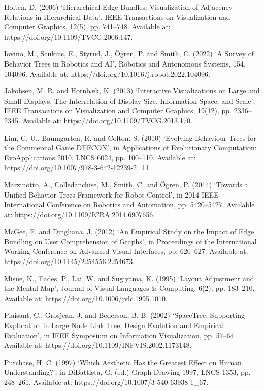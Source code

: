 \documentclass[11pt,a4paper,oneside,extrafontsizes]{memoir}
\begin{document}
Holten, D. (2006) ‘Hierarchical Edge Bundles: Visualization of Adjacency Relations in Hierarchical Data’, IEEE Transactions on Visualization and Computer Graphics, 12(5), pp. 741–748. Available at: https://doi.org/10.1109/TVCG.2006.147.

Iovino, M., Scukins, E., Styrud, J., Ögren, P. and Smith, C. (2022) ‘A Survey of Behavior Trees in Robotics and AI’, Robotics and Autonomous Systems, 154, 104096. Available at: https://doi.org/10.1016/j.robot.2022.104096.

Jakobsen, M. R. and Hornbæk, K. (2013) ‘Interactive Visualizations on Large and Small Displays: The Interrelation of Display Size, Information Space, and Scale’, IEEE Transactions on Visualization and Computer Graphics, 19(12), pp. 2336–2345. Available at: https://doi.org/10.1109/TVCG.2013.170.

Lim, C.-U., Baumgarten, R. and Colton, S. (2010) ‘Evolving Behaviour Trees for the Commercial Game DEFCON’, in Applications of Evolutionary Computation: EvoApplications 2010, LNCS 6024, pp. 100–110. Available at: https://doi.org/10.1007/978-3-642-12239-2\_11.

Marzinotto, A., Colledanchise, M., Smith, C. and Ögren, P. (2014) ‘Towards a Unified Behavior Trees Framework for Robot Control’, in 2014 IEEE International Conference on Robotics and Automation, pp. 5420–5427. Available at: https://doi.org/10.1109/ICRA.2014.6907656.

McGee, F. and Dingliana, J. (2012) ‘An Empirical Study on the Impact of Edge Bundling on User Comprehension of Graphs’, in Proceedings of the International Working Conference on Advanced Visual Interfaces, pp. 620–627. Available at: https://doi.org/10.1145/2254556.2254673.

Misue, K., Eades, P., Lai, W. and Sugiyama, K. (1995) ‘Layout Adjustment and the Mental Map’, Journal of Visual Languages \& Computing, 6(2), pp. 183–210. Available at: https://doi.org/10.1006/jvlc.1995.1010.

Plaisant, C., Grosjean, J. and Bederson, B. B. (2002) ‘SpaceTree: Supporting Exploration in Large Node Link Tree, Design Evolution and Empirical Evaluation’, in IEEE Symposium on Information Visualization, pp. 57–64. Available at: https://doi.org/10.1109/INFVIS.2002.1173148.

Purchase, H. C. (1997) ‘Which Aesthetic Has the Greatest Effect on Human Understanding?’, in DiBattista, G. (ed.) Graph Drawing 1997, LNCS 1353, pp. 248–261. Available at: https://doi.org/10.1007/3-540-63938-1\_67.
\end{document}
